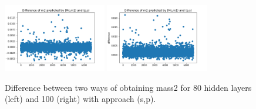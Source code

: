 \documentclass[prd,aps,twocolumn,a4paper,showkeys,nofootinbib]{article}
\begin{document}
\begin{figure}[]
  \center
  \includegraphics[width=0.4\textwidth]{./Figs/80_m2_dif}
  \includegraphics[width=0.4\textwidth]{./Figs/100_m2_dif}
  \caption{\label{fig:approach3_comparison2} Difference between two ways of obtaining mass2 for 80 hidden layers (left) and 100 (right) with approach (s,p).}
\end{figure}
\end{document}
